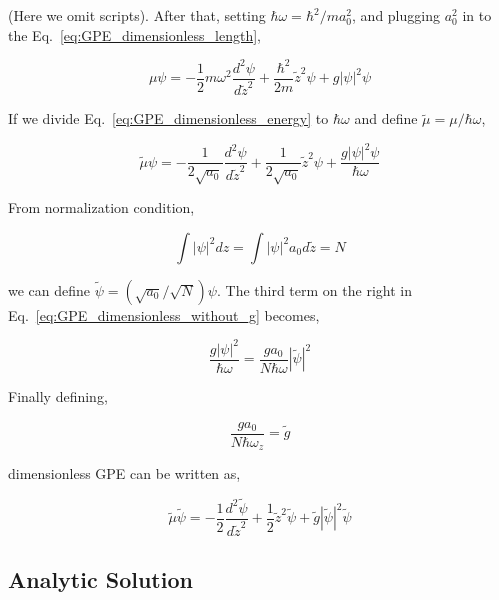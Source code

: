 \documentclass[a4paper,times,12pt]{article}
\begin{document}
\noindent (Here we omit scripts). After that, setting $\hbar\omega = {\hbar^2}/{m a_0^2}$, and plugging $a_0^2$ in to the Eq.~\ref{eq:GPE_dimensionless_length},

\begin{equation}
\label{eq:GPE_dimensionless_energy}
\mu\psi = -\frac{1}{2}m\omega^2\frac{d^2\psi}{d\widetilde{z}^2} + \frac{\hbar^2}{2m}\widetilde{z}^2\psi + g|\psi|^2\psi
\end{equation}

\noindent If we divide Eq.~\ref{eq:GPE_dimensionless_energy} to $\hbar\omega$ and define $\widetilde{\mu} = \mu/\hbar\omega$,

\begin{equation}
\label{eq:GPE_dimensionless_without_g}
\widetilde{\mu} \psi = -\frac{1}{2\sqrt{a_0}}\frac{d^2\psi}{d\widetilde{z}^2} + \frac{1}{2\sqrt{a_0}}\widetilde{z}^2\psi + \frac{g|\psi|^2\psi}{\hbar\omega}
\end{equation}

\noindent From normalization condition,

\begin{equation}
\int |\psi|^2dz = \int |\psi|^2 a_0 d\widetilde{z} = N
\end{equation}

\noindent we can define $\widetilde{\psi} = ({\sqrt{a_0}}/{\sqrt{N}})\psi$. The third term on the right in Eq.~\ref{eq:GPE_dimensionless_without_g} becomes,

\begin{equation}
\label{eq:GPE_dimensionless_g_1}
\frac{g|\psi|^2}{\hbar\omega} = \frac{g a_0}{N\hbar\omega}|\widetilde{\psi}|^2 
\end{equation}

\noindent Finally defining,

\begin{equation}
\label{eq:GPE_dimensionless_g_2}
\frac{g a_0}{N\hbar\omega_z} = \widetilde{g}
\end{equation}

\noindent dimensionless GPE can be written as,

\begin{equation}
\label{eq:GPE_dimensionless}
\widetilde{\mu} \widetilde{\psi} = -\frac{1}{2}\frac{d^2\widetilde{\psi}}{d\widetilde{z}^2} + \frac{1}{2}\widetilde{z}^2\widetilde{\psi} + \widetilde{g}|\widetilde{\psi}|^2 \widetilde{\psi}
\end{equation}


\subsection{Analytic Solution}
\end{document}

